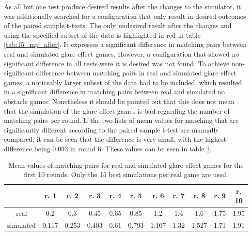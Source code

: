 As all but one test produce desired results after the changes to the simulator, it was additionally searched for a configuration that only result in desired outcomes of the paired sample t-tests. The only undesired result after the changes and using the specified subset of the data is highlighted in red in table \ref{tab:15_mp_after}. It expresses a significant difference in matching pairs between real and simulated glare effect games. However, a configuration that showed no significant difference in all tests were it is desired was not found. To achieve non-significant difference between matching pairs in real and simulated glare effect games, a noticeably larger subset of the data had to be included, which resulted in a significant difference in matching pairs between real and simulated no obstacle games. 
Nonetheless it should be pointed out that this does not mean that the simulation of the glare effect games is bad regarding the number of matching pairs per round. If the two lists of mean values for matching that are significantly different according to the paired sample t-test are manually compared, it can be seen that the difference is very small, with the highest difference being 0.093 in round 6. These values can be seen in table \ref{tab:small_difference}. %

\begin{table}[H]
	\centering
	\begin{tabular}{|c|c|c|c|c|c|c|c|c|c|c|}
		\hline
		& r. 1   &  r. 2  & r. 3 & r. 4   &  r. 5  & r. 6& r. 7   &  r. 8  & r. 9	&	r. 10\\
		\hline
		real&0.2 &0.3	&  0.45  &  0.65   &0.85 &  1.2   &    1.4 & 1.6 &  1.75 &1.95	\\
		\hline
		simulated&0.117 &0.253 &	0.403 &0.61  & 0.793 & 1.107& 1.32 & 1.527 & 1.71 & 1.91		\\
		\hline
	\end{tabular}
	\caption[Mean values of matching pairs for real and simulated glare effect games for the first 10 rounds. Only the 15 best simulations per real game are used.]{Mean values of matching pairs for real and simulated glare effect games for the first 10 rounds. Only the 15 best simulations per real game are used.}
	\label{tab:small_difference}
\end{table}


